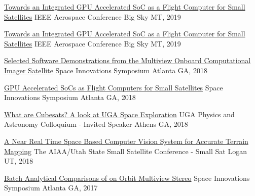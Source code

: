 \documentclass[10pt,a4paper]{article}
\begin{document}
\headedsection
  {{\color{bluegreen} \faStickyNoteO} \href{http://smallsat.uga.edu/images/documents/papers/Adams_GPU_Paper.pdf}{Towards an Integrated GPU Accelerated SoC as a Flight Computer for Small Satellites}}{%
  \headedsubsection
    {IEEE Aerospace Conference}
    {Big Sky MT, 2019}
    {}
}

\headedsection
  {{\color{bluegreen} \faTelevision} \href{http://smallsat.uga.edu/images/documents/presentations/IEEE_Aerospace_GPU_Presentation.pdf}{Towards an Integrated GPU Accelerated SoC as a Flight Computer for Small Satellites}}{%
  \headedsubsection
    {IEEE Aerospace Conference}
    {Big Sky MT, 2019}
    {}
}

\headedsection
  {{\color{bluegreen} \faTelevision} \href{http://smallsat.uga.edu/images/documents/presentations/MOCI_Software_Demo2018.pdf}{Selected Software Demonstrations from the Multiview Onboard Computational Imager Satellite}}{%
  \headedsubsection
    {Space Innovations Symposium}
    {Atlanta GA, 2018}
    {}
}

\headedsection
  {{\color{bluegreen} \faMapO} \href{http://smallsat.uga.edu/images/documents/posters/GPU_SmallSatposter.pdf}{GPU Accelerated SoCs as Flight Computers for Small Satellites}}{%
  \headedsubsection
    {Space Innovations Symposium}
    {Atlanta GA, 2018}
    {}
}

\headedsection
  {{\color{bluegreen} \faTelevision} \href{http://smallsat.uga.edu/}{What are Cubesats? A look at UGA Space Exploration}}{%
  \headedsubsection
    {UGA Physics and Astronomy Colloquium - Invited Speaker}
    {Athens GA, 2018}
    {}
}

\headedsection
  {{\color{bluegreen} \faStickyNoteO} \href{http://smallsat.uga.edu/images/documents/papers/Adams_32nd_SmallSatConference.pdf}{A Near Real Time Space Based Computer Vision System for Accurate Terrain Mapping}}{%
  \headedsubsection
    {The AIAA/Utah State Small Satellite Conference - Small Sat}
    {Logan UT, 2018}
    {}
}

\headedsection
  {{\color{bluegreen} \faTelevision} \href{http://smallsat.uga.edu/images/documents/presentations/Adams,Caleb_Presentation.pdf}{Batch Analytical Comparisons of on Orbit Multiview Stereo}}{%
  \headedsubsection
    {Space Innovations Symposium}
    {Atlanta GA, 2017}
    {}
}
\end{document}
